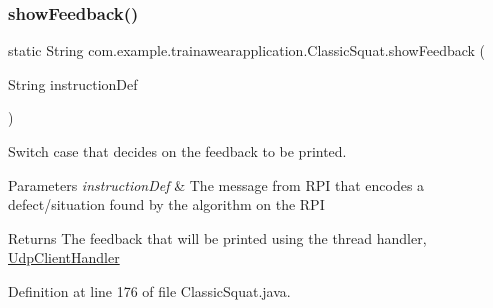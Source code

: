 \subsubsection{\texorpdfstring{showFeedback()}{showFeedback()}}
{\footnotesize\ttfamily static String com.\+example.\+trainawearapplication.\+Classic\+Squat.\+show\+Feedback (\begin{DoxyParamCaption}\item[{String}]{instruction\+Def }\end{DoxyParamCaption})\hspace{0.3cm}{\ttfamily [static]}}



Switch case that decides on the feedback to be printed. 


\begin{DoxyParams}{Parameters}
{\em instruction\+Def} & The message from R\+PI that encodes a defect/situation found by the algorithm on the R\+PI \\
\hline
\end{DoxyParams}
\begin{DoxyReturn}{Returns}
The feedback that will be printed using the thread handler, \mbox{\hyperlink{classcom_1_1example_1_1trainawearapplication_1_1_udp_client_handler}{Udp\+Client\+Handler}} 
\end{DoxyReturn}


Definition at line 176 of file Classic\+Squat.\+java.


